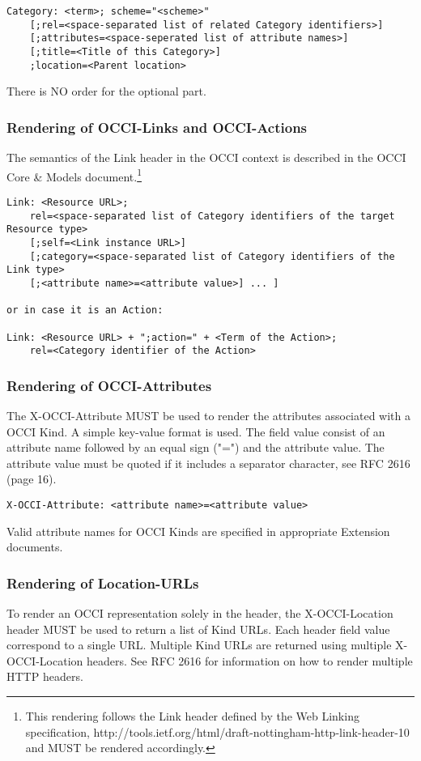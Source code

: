 \documentclass[10pt,a4paper]{article}
\begin{document}
\begin{verbatim}
Category: <term>; scheme="<scheme>"
    [;rel=<space-separated list of related Category identifiers>]
    [;attributes=<space-seperated list of attribute names>]
    [;title=<Title of this Category>]    
    ;location=<Parent location>
\end{verbatim}

There is NO order for the optional part.

\subsubsection{Rendering of OCCI-Links and OCCI-Actions}
The semantics of the Link header in the OCCI context is described in
the OCCI Core \& Models document.\footnote{This rendering follows the
  Link header defined by the Web Linking specification,
  http://tools.ietf.org/html/draft-nottingham-http-link-header-10 and
  MUST be rendered accordingly.}

\begin{verbatim}
Link: <Resource URL>;
    rel=<space-separated list of Category identifiers of the target Resource type>
    [;self=<Link instance URL>]
    [;category=<space-separated list of Category identifiers of the Link type>
    [;<attribute name>=<attribute value>] ... ]

or in case it is an Action:

Link: <Resource URL> + ";action=" + <Term of the Action>;
    rel=<Category identifier of the Action>
\end{verbatim}

\subsubsection{Rendering of OCCI-Attributes}
The X-OCCI-Attribute MUST be used to render the attributes associated
with a OCCI Kind. A simple key-value format is used. The field value
consist of an attribute name followed by an equal sign ("=") and the
attribute value. The attribute value must be quoted if it includes a
separator character, see RFC 2616 (page 16).

\begin{verbatim}
X-OCCI-Attribute: <attribute name>=<attribute value>
\end{verbatim}

Valid attribute names for OCCI Kinds are specified in appropriate
Extension documents.

\subsubsection{Rendering of Location-URLs}
To render an OCCI representation solely in the header, the
X-OCCI-Location header MUST be used to return a list of Kind
URLs. Each header field value correspond to a single URL. Multiple
Kind URLs are returned using multiple X-OCCI-Location headers. See RFC
2616 for information on how to render multiple HTTP headers.
\end{document}
